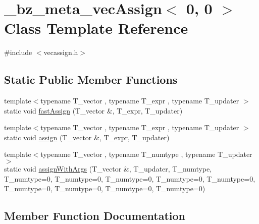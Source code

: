 \hypertarget{class__bz__meta__vecAssign_3_010_00_010_01_4}{}\section{\+\_\+bz\+\_\+meta\+\_\+vec\+Assign$<$ 0, 0 $>$ Class Template Reference}
\label{class__bz__meta__vecAssign_3_010_00_010_01_4}


{\ttfamily \#include $<$vecassign.\+h$>$}

\subsection*{Static Public Member Functions}
\begin{DoxyCompactItemize}
\item 
{\footnotesize template$<$typename T\+\_\+vector , typename T\+\_\+expr , typename T\+\_\+updater $>$ }\\static void \hyperlink{class__bz__meta__vecAssign_3_010_00_010_01_4_af634d70c3fc34b03df214c6061610f5a}{fast\+Assign} (T\+\_\+vector \&, T\+\_\+expr, T\+\_\+updater)
\item 
{\footnotesize template$<$typename T\+\_\+vector , typename T\+\_\+expr , typename T\+\_\+updater $>$ }\\static void \hyperlink{class__bz__meta__vecAssign_3_010_00_010_01_4_a5ddabc89914f98cb7fcb93d25d1bedbb}{assign} (T\+\_\+vector \&, T\+\_\+expr, T\+\_\+updater)
\item 
{\footnotesize template$<$typename T\+\_\+vector , typename T\+\_\+numtype , typename T\+\_\+updater $>$ }\\static void \hyperlink{class__bz__meta__vecAssign_3_010_00_010_01_4_abe85a1eeed242c411d6b7e4d3f3daa96}{assign\+With\+Args} (T\+\_\+vector \&, T\+\_\+updater, T\+\_\+numtype, T\+\_\+numtype=0, T\+\_\+numtype=0, T\+\_\+numtype=0, T\+\_\+numtype=0, T\+\_\+numtype=0, T\+\_\+numtype=0, T\+\_\+numtype=0, T\+\_\+numtype=0, T\+\_\+numtype=0)
\end{DoxyCompactItemize}


\subsection{Member Function Documentation}
\hypertarget{class__bz__meta__vecAssign_3_010_00_010_01_4_a5ddabc89914f98cb7fcb93d25d1bedbb}{}
